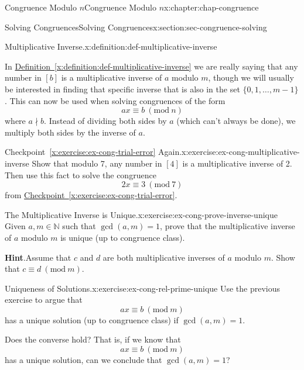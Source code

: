 \documentclass[oneside,10pt,]{book}
\newcommand{\blocktitlefont}{\relax}
\newcommand{\xreffont}{\relax}
\numberwithin{equation}{section}
\newcommand{\Mod}[1]{\ \left(\mathrm{mod}\ #1\right)}
\begin{document}
\begin{chapterptx}{Congruence Modulo \(n\)}{}{Congruence Modulo \(n\)}{}{}{x:chapter:chap-congruence}
\begin{sectionptx}{Solving Congruences}{}{Solving Congruences}{}{}{x:section:sec-congruence-solving}
\begin{definition}{Multiplicative Inverse.}{x:definition:def-multiplicative-inverse}
\end{definition}
In \hyperref[x:definition:def-multiplicative-inverse]{Definition~{\xreffont\ref{x:definition:def-multiplicative-inverse}}} we are really saying that any number in \([b]\) is a multiplicative inverse of \(a\) modulo \(m\), though we will usually be interested in finding that specific inverse that is also in the set \(\{0,1,\ldots,m-1\}\). This can now be used when solving congruences of the form%
\begin{equation*}
ax \equiv b \Mod{n}
\end{equation*}
where \(a \nmid b\). Instead of dividing both sides by \(a\) (which can't always be done), we multiply both sides by the inverse of \(a\).%
\begin{inlineexercise}{Checkpoint~{\xreffont\ref*{x:exercise:ex-cong-trial-error}} Again.}{x:exercise:ex-cong-multiplicative-inverse}%
Show that modulo 7, any number in \([4]\) is a multiplicative inverse of 2. Then use this fact to solve the congruence%
\begin{equation*}
2x \equiv 3 \Mod{7}
\end{equation*}
from \hyperref[x:exercise:ex-cong-trial-error]{Checkpoint~{\xreffont\ref{x:exercise:ex-cong-trial-error}}}.%
\end{inlineexercise}
\begin{inlineexercise}{The Multiplicative Inverse is Unique.}{x:exercise:ex-cong-prove-inverse-unique}%
Given \(a, m \in \mathbb{N}\) such that \(\gcd(a,m) = 1\), prove that the multiplicative inverse of \(a\) modulo \(m\) is unique (up to congruence class).%
\par\smallskip%
\noindent\textbf{\blocktitlefont Hint}.\hypertarget{g:hint:id332204}{}\quad{}Assume that \(c\) and \(d\) are both multiplicative inverses of \(a\) modulo \(m\). Show that \(c \equiv d \Mod{m}\).%
\end{inlineexercise}
\begin{inlineexercise}{Uniqueness of Solutions.}{x:exercise:ex-cong-rel-prime-unique}%
Use the previous exercise to argue that%
\begin{equation*}
ax \equiv b \Mod{m}
\end{equation*}
has a unique solution (up to congruence class) if \(\gcd(a,m) = 1\).%
\par
Does the converse hold? That is, if we know that%
\begin{equation*}
ax \equiv b \Mod{m}
\end{equation*}
has a unique solution, can we conclude that \(\gcd(a,m) = 1\)?%

\end{inlineexercise}
\end{sectionptx}
\end{chapterptx}
\end{document}
